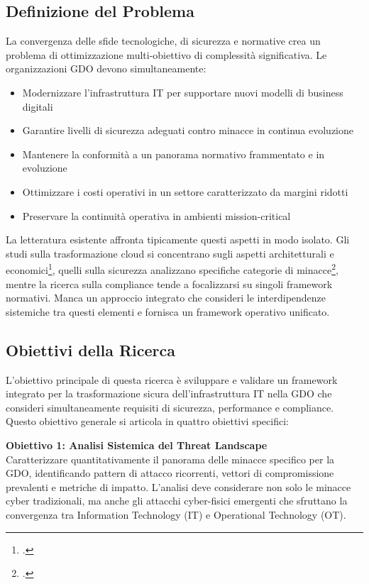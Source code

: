 \subsection{Definizione del Problema}

La convergenza delle sfide tecnologiche, di sicurezza e normative crea un problema di ottimizzazione multi-obiettivo di complessità significativa. Le organizzazioni GDO devono simultaneamente:

\begin{itemize}
\item Modernizzare l'infrastruttura IT per supportare nuovi modelli di business digitali
\item Garantire livelli di sicurezza adeguati contro minacce in continua evoluzione
\item Mantenere la conformità a un panorama normativo frammentato e in evoluzione
\item Ottimizzare i costi operativi in un settore caratterizzato da margini ridotti
\item Preservare la continuità operativa in ambienti mission-critical
\end{itemize}

La letteratura esistente affronta tipicamente questi aspetti in modo isolato. Gli studi sulla trasformazione cloud si concentrano sugli aspetti architetturali e economici\footcite{forrester2024}, quelli sulla sicurezza analizzano specifiche categorie di minacce\footcite{ponemon2024}, mentre la ricerca sulla compliance tende a focalizzarsi su singoli framework normativi. Manca un approccio integrato che consideri le interdipendenze sistemiche tra questi elementi e fornisca un framework operativo unificato.

\subsection{Obiettivi della Ricerca}

L'obiettivo principale di questa ricerca è sviluppare e validare un framework integrato per la trasformazione sicura dell'infrastruttura IT nella GDO che consideri simultaneamente requisiti di sicurezza, performance e compliance. Questo obiettivo generale si articola in quattro obiettivi specifici:

\textbf{Obiettivo 1: Analisi Sistemica del Threat Landscape}\\
Caratterizzare quantitativamente il panorama delle minacce specifico per la GDO, identificando pattern di attacco ricorrenti, vettori di compromissione prevalenti e metriche di impatto. L'analisi deve considerare non solo le minacce cyber tradizionali, ma anche gli attacchi cyber-fisici emergenti che sfruttano la convergenza tra Information Technology (IT) e Operational Technology (OT).


